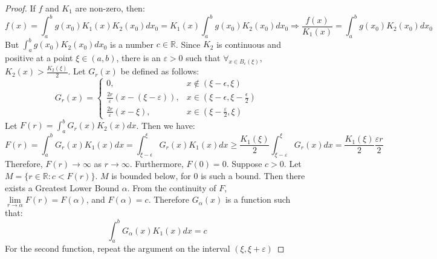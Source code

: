 \documentclass[crop=false,class=book,oneside]{standalone}
\begin{document}
            \begin{proof}
                If $f$ and $K_{1}$ are non-zero, then:
                \begin{equation*}
                    f(x)=\int_{a}^{b}g(x_{0})K_{1}(x)
                         K_{2}(x_{0})dx_{0}
                        =K_{1}(x)\int_{a}^{b}g(x_{0})
                         K_{2}(x_{0})dx_{0}\Rightarrow
                    \frac{f(x)}{K_{1}(x)}=
                    \int_{a}^{b}g(x_{0})K_{2}(x_{0})dx_{0}
                \end{equation*}
                But $\int_{a}^{b}g(x_{0})K_{2}(x_{0})dx_{0}$ is a
                number $c\in\mathbb{R}$. Since $K_{2}$ is continuous
                and positive at a point $\xi\in(a,b)$, there is an
                $\varepsilon>0$ such that
                $\forall_{x\in B_{\varepsilon}(\xi)}$,
                $K_{2}(x)>\frac{K_{2}(\xi)}{2}$.
                Let $G_{r}(x)$ be defined as follows:
                \begin{equation}
                    G_{r}(x)=\begin{cases}
                        0,&x\notin(\xi-\epsilon,\xi)\\
                        \frac{2r}{\varepsilon}(x-(\xi-\varepsilon)),
                        &x\in(\xi-\epsilon,\xi-\frac{\epsilon}{2})\\
                        \frac{2r}{\varepsilon}(x-\xi),&
                        x\in(\xi-\frac{\varepsilon}{2},\xi)
                    \end{cases}
                \end{equation}
                Let $F(r)=\int_{a}^{b}G_{r}(x)K_{2}(x)dx$.
                Then we have:
                \begin{equation*}
                    F(r)=\int_{a}^{b}G_{r}(x)K_{1}(x)dx
                        =\int_{\xi-\epsilon}^{\xi}G_{r}(x)K_{1}(x)dx
                    \geq \frac{K_{1}(\xi)}{2}
                         \int_{\xi-\varepsilon}^{\xi}G_{r}(x)dx
                        =\frac{K_{1}(\xi)}{2}\frac{\varepsilon r}{2}
                \end{equation*}
                Therefore, $F(r)\rightarrow \infty$ as
                $r\rightarrow\infty$. Furthermore, $F(0) = 0$.
                Suppose $c>0$. Let $M=\{r\in\mathbb{R}:c<F(r)\}$.
                $M$ is bounded below, for $0$ is such a bound. Then
                there exists a Greatest Lower Bound $\alpha$. From
                the continuity of $F$,
                $\underset{r\rightarrow\alpha}{\lim}F(r)=F(\alpha)$,
                and $F(\alpha)=c$. Therefore $G_{\alpha}(x)$ is a
                function such that:
                \begin{equation*}
                    \int_{a}^{b}G_{\alpha}(x)K_{1}(x)dx=c
                \end{equation*}
                For the second function, repeat the argument on the
                interval $(\xi,\xi+\varepsilon)$
            \end{proof}
\end{document}
